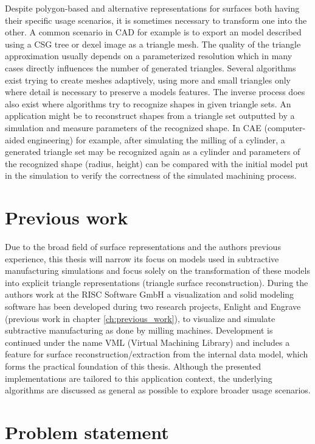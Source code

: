 Despite polygon-based and alternative representations for surfaces both having their specific usage scenarios, it is sometimes necessary to transform one into the other.
A common scenario in CAD for example is to export an model described using a CSG tree or dexel image as a triangle mesh.
The quality of the triangle approximation usually depends on a parameterized resolution which in many cases directly influences the number of generated triangles.
Several algorithms exist trying to create meshes adaptively, using more and small triangles only where detail is necessary to preserve a models features.
%
The inverse process does also exist where algorithms try to recognize shapes in given triangle sets.
An application might be to reconstruct shapes from a triangle set outputted by a simulation and measure parameters of the recognized shape.
In CAE (computer-aided engineering) for example, after simulating the milling of a cylinder, a generated triangle set may be recognized again as a cylinder and parameters of the recognized shape (\eg radius, height) can be compared with the initial model put in the simulation to verify the correctness of the simulated machining process.


\section{Previous work}

Due to the broad field of surface representations and the authors previous experience, this thesis will narrow its focus on models used in subtractive manufacturing simulations and focus solely on the transformation of these models into explicit triangle representations (triangle surface reconstruction).
During the authors work at the RISC Software GmbH a visualization and solid modeling software has been developed during two research projects, Enlight and Engrave (\cf previous work in chapter \ref{ch:previous_work}), to visualize and simulate subtractive manufacturing as done by milling machines.
Development is continued under the name VML (Virtual Machining Library) and includes a feature for surface reconstruction/extraction from the internal data model, which forms the practical foundation of this thesis.
Although the presented implementations are tailored to this application context, the underlying algorithms are discussed as general as possible to explore broader usage scenarios.


\section{Problem statement}
\label{sec:problem}

